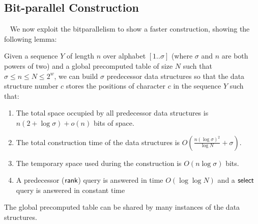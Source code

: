 \documentclass[11pt,runningheads]{llncs}
\def\rank{\mbox{\rm {\sf rank}}}
\def\select{\mbox{\rm {\sf select}}}
\begin{document}
\subsection{Bit-parallel Construction}
~\label{sec:bit_parallel_Elias_Fano_construction}
We now exploit the bitparallelism to show a faster construction, showing the following lemma: 
\begin{lemma}
\label{lemma:bit_parallel_elias_fano_build}
Given a sequence $Y$ of length $n$ over alphabet $[1..\sigma]$ 
(where $\sigma$ and $n$ are both powers of two) and a global precomputed table of size $N$ 
such that $\sigma\leq n\leq N\leq 2^w$, we can build $\sigma$ predecessor data structures 
so that the data structure number $c$ stores the positions of character $c$  in the sequence $Y$ such that: 
\begin{enumerate} 
\item The total space occupied by all predecessor data structures is $n(2+\log\sigma)+o(n)$ bits of space. 
\item The total construction time of the data structures is $O(\frac{n(\log\sigma)^2}{\log N}+\sigma)$. 
\item The temporary space used during the construction is $O(n\log\sigma)$ bits. 
\item A predecessor ($\rank$) query is answered in time $O(\log\log N)$ and 
a $\select$ query is answered in constant time
\end{enumerate}
The global precomputed table can be shared by many instances of the data structures. 
\end{lemma}
\end{document}
